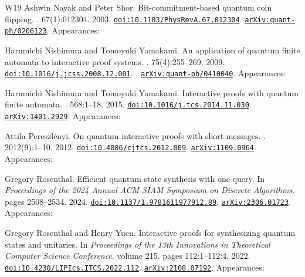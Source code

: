 \documentclass[10pt,a4paper]{article}
\numberwithin{equation}{section}
\numberwithin{figure}{section}
\begin{document}
\begin{thebibliography}{{}W19}
Ashwin Nayak and Peter Shor.
\newblock Bit-commitment-based quantum coin flipping.
. 67(1):012304. 2003.
\newblock \href {https://doi.org/10.1103/PhysRevA.67.012304} {\texttt{doi:10.1103/PhysRevA.67.012304}}. \href {https://arxiv.org/abs/quant-ph/0206123} {\texttt{arXiv:quant-ph/0206123}}. Appearances:\!

Harumichi Nishimura and Tomoyuki Yamakami.
\newblock An application of quantum finite automata to interactive proof systems.
. 75(4):255--269. 2009.
\newblock \href {https://doi.org/10.1016/j.jcss.2008.12.001} {\texttt{doi:10.1016/j.jcss.2008.12.001}}. . \href {https://arxiv.org/abs/quant-ph/0410040} {\texttt{arXiv:quant-ph/0410040}}. Appearances:\!

Harumichi Nishimura and Tomoyuki Yamakami.
\newblock Interactive proofs with quantum finite automata.
. 568:1--18. 2015.
\newblock \href {https://doi.org/10.1016/j.tcs.2014.11.030} {\texttt{doi:10.1016/j.tcs.2014.11.030}}. \href {https://arxiv.org/abs/1401.2929} {\texttt{arXiv:1401.2929}}. Appearances:\!

Attila Pereszl{\'e}nyi.
\newblock On quantum interactive proofs with short messages.
. 2012(9):1--10. 2012.
\newblock \href {https://doi.org/10.4086/cjtcs.2012.009} {\texttt{doi:10.4086/cjtcs.2012.009}}. \href {https://arxiv.org/abs/1109.0964} {\texttt{arXiv:1109.0964}}. Appearances:\!

Gregory Rosenthal.
\newblock Efficient quantum state synthesis with one query.
\newblock In {\em Proceedings of the 2024 Annual ACM-SIAM Symposium on Discrete Algorithms}. pages 2508--2534. 2024.
\newblock \href {https://doi.org/10.1137/1.9781611977912.89} {\texttt{doi:10.1137/1.9781611977912.89}}. \href {https://arxiv.org/abs/2306.01723} {\texttt{arXiv:2306.01723}}. Appearances:\!

Gregory Rosenthal and Henry Yuen.
\newblock Interactive proofs for synthesizing quantum states and unitaries.
\newblock In {\em Proceedings of the 13th Innovations in Theoretical Computer Science Conference}. volume 215. pages 112:1--112:4. 2022.
\newblock \href {https://doi.org/10.4230/LIPIcs.ITCS.2022.112} {\texttt{doi:10.4230/LIPIcs.ITCS.2022.112}}. \href {https://arxiv.org/abs/2108.07192} {\texttt{arXiv:2108.07192}}. Appearances:\!


\end{thebibliography}
\end{document}
